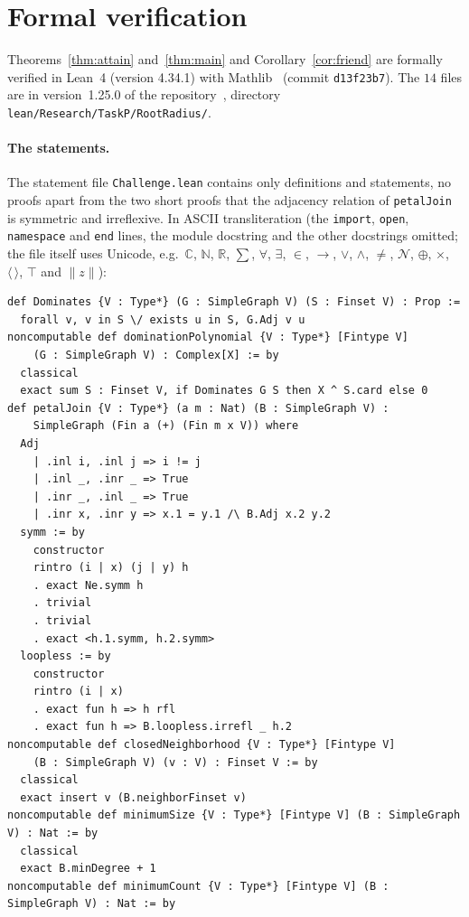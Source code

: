 \documentclass[11pt]{article}
\theoremstyle{definition}
\theoremstyle{remark}
\newcommand{\repoversion}{1.25.0}
\begin{document}
{\sloppy
\section{Formal verification}\label{sec:lean}

Theorems~\ref{thm:attain} and~\ref{thm:main} and Corollary~\ref{cor:friend}
are formally verified in Lean~4 (version 4.34.1) with Mathlib~\cite{mathlib}
(commit \texttt{d13f23b7}). The $14$ files are in version~\repoversion{} of
the repository~\cite{repo}, directory
\texttt{lean/Research/TaskP/RootRadius/}.

\paragraph{The statements.}
The statement file \texttt{Challenge.lean} contains only definitions and
statements, no proofs apart from the two short proofs that the adjacency
relation of \texttt{petalJoin} is symmetric and irreflexive. In ASCII
transliteration (the \texttt{import}, \texttt{open}, \texttt{namespace} and
\texttt{end} lines, the module docstring and the other docstrings omitted;
the file itself uses Unicode, e.g.\ $\mathbb C$, $\mathbb N$, $\mathbb R$, $\sum$, $\forall$,
$\exists$, $\in$, $\to$, $\vee$, $\wedge$, $\ne$, $\mathcal N$, $\oplus$, $\times$, $\langle\,\rangle$, $\top$ and
$\|z\|$):
{\footnotesize
\begin{verbatim}
def Dominates {V : Type*} (G : SimpleGraph V) (S : Finset V) : Prop :=
  forall v, v in S \/ exists u in S, G.Adj v u
noncomputable def dominationPolynomial {V : Type*} [Fintype V]
    (G : SimpleGraph V) : Complex[X] := by
  classical
  exact sum S : Finset V, if Dominates G S then X ^ S.card else 0
def petalJoin {V : Type*} (a m : Nat) (B : SimpleGraph V) :
    SimpleGraph (Fin a (+) (Fin m x V)) where
  Adj
    | .inl i, .inl j => i != j
    | .inl _, .inr _ => True
    | .inr _, .inl _ => True
    | .inr x, .inr y => x.1 = y.1 /\ B.Adj x.2 y.2
  symm := by
    constructor
    rintro (i | x) (j | y) h
    . exact Ne.symm h
    . trivial
    . trivial
    . exact <h.1.symm, h.2.symm>
  loopless := by
    constructor
    rintro (i | x)
    . exact fun h => h rfl
    . exact fun h => B.loopless.irrefl _ h.2
noncomputable def closedNeighborhood {V : Type*} [Fintype V]
    (B : SimpleGraph V) (v : V) : Finset V := by
  classical
  exact insert v (B.neighborFinset v)
noncomputable def minimumSize {V : Type*} [Fintype V] (B : SimpleGraph V) : Nat := by
  classical
  exact B.minDegree + 1
noncomputable def minimumCount {V : Type*} [Fintype V] (B : SimpleGraph V) : Nat := by

\end{verbatim}}}
\end{document}
